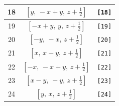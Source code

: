 \documentclass[fleqn,8pt]{jsarticle}
\begin{document}
\begin{longtable}{ccc}
18 & $\left[ y,\, - x + y,\, z + \frac{1}{2} \right]$ & {\tt [18]} \\ \hline
19 & $\left[ - x + y,\, y,\, z + \frac{1}{2} \right]$ & {\tt [19]} \\ \hline
20 & $\left[ - y,\, - x,\, z + \frac{1}{2} \right]$ & {\tt [20]} \\ \hline
21 & $\left[ x,\, x - y,\, z + \frac{1}{2} \right]$ & {\tt [21]} \\ \hline
22 & $\left[ - x,\, - x + y,\, z + \frac{1}{2} \right]$ & {\tt [22]} \\ \hline
23 & $\left[ x - y,\, - y,\, z + \frac{1}{2} \right]$ & {\tt [23]} \\ \hline
24 & $\left[ y,\, x,\, z + \frac{1}{2} \right]$ & {\tt [24]} \\
\end{longtable}
\end{document}
